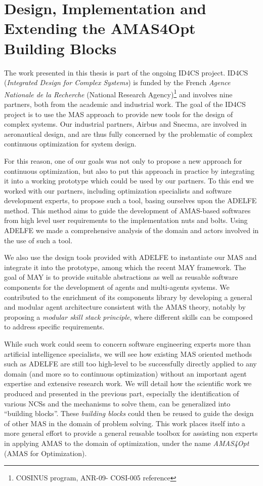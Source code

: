 \part{Design, Implementation and Extending the AMAS4Opt Building Blocks}

The work presented in this thesis is part of the ongoing ID4CS project. ID4CS (\emph{Integrated Design for Complex Systems}) is funded by the French \emph{Agence Nationale de la Recherche} (National Research Agency)\footnote{COSINUS program, ANR-09-
COSI-005 reference} and involves nine partners, both from the academic and industrial work. The goal of the ID4CS project is to use the MAS approach to provide new tools for the design of complex systems. Our industrial partners, Airbus and Snecma, are involved in aeronautical design, and are thus fully concerned by the problematic of complex continuous optimization for system design.

For this reason, one of our goals was not only to propose a new approach for continuous optimization, but also to put this approach in practice by integrating it into a working prototype which could be used by our partners. To this end we worked with our partners, including optimization specialists and software development experts, to propose such a tool, basing ourselves upon the ADELFE method. This method aims to guide the development of AMAS-based softwares from high level user requirements to the implementation nuts and bolts. Using ADELFE we made a comprehensive analysis of the domain and actors involved in the use of such a tool.

We also use the design tools provided with ADELFE to instantiate our MAS and integrate it into the prototype, among which the recent MAY framework. The goal of MAY is to provide suitable abstractions as well as reusable software components for the development of agents and multi-agents systems. We contributed to the enrichment of its components library by developing a general and modular agent architecture consistent with the AMAS theory, notably by proposing a \emph{modular skill stack principle}, where different skills can be composed to address specific requirements.

While such work could seem to concern software engineering experts more than artificial intelligence specialists, we will see how existing MAS oriented methods such as ADELFE are still too high-level to be successfully directly applied to any domain (and more so to continuous optimization) without an important agent expertise and extensive research work. We will detail how the scientific work we produced and presented in the previous part, especially the identification of various NCSs and the mechanisms to solve them, can be generalized into \enquote{building blocks}. These \emph{building blocks} could then be reused to guide the design of other MAS in the domain of problem solving. This work places itself into a more general effort to provide a general reusable toolbox for assisting non experts in applying AMAS to the domain of optimization, under the name \emph{AMAS4Opt} (AMAS for Optimization).

